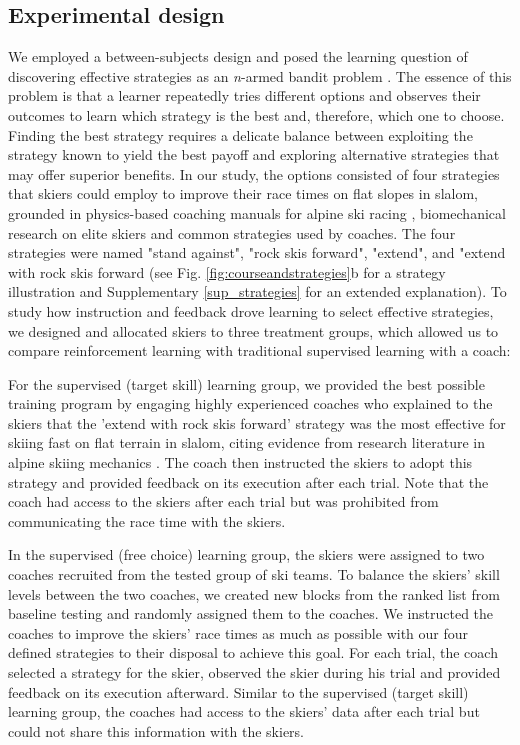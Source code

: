 \documentclass[pdflatex,sn-nature]{sn-jnl}%
\theoremstyle{thmstyleone}%
\theoremstyle{thmstyletwo}%
\theoremstyle{thmstylethree}%
\begin{document}
\subsection{Experimental design}
We employed a between-subjects design and posed the learning question of discovering effective strategies as an \textit{n}-armed bandit problem \cite{sutton_reinforcement_2018}. The essence of this problem is that a learner repeatedly tries different options and observes their outcomes to learn which strategy is the best and, therefore, which one to choose. Finding the best strategy requires a delicate balance between exploiting the strategy known to yield the best payoff and exploring alternative strategies that may offer superior benefits. In our study, the options consisted of four strategies that skiers could employ to improve their race times on flat slopes in slalom, grounded in physics-based coaching manuals for alpine ski racing \cite{lemaster_skiers_1999, lemaster_ultimate_2010, lind_physics_2013, mote_accelerations_1983}, biomechanical research on elite skiers \cite{reid_kinematic_2010, reid_alpine_2020, magelssen_is_2022}  and common strategies used by coaches.  The four strategies were named "stand against", "rock skis forward", "extend", and "extend with rock skis forward (see Fig. \ref{fig:courseandstrategies}b for a strategy illustration and Supplementary \ref{sup_strategies} for an extended explanation). To study how instruction and feedback drove learning to select effective strategies, we designed and allocated skiers to three treatment groups, which allowed us to compare reinforcement learning with traditional supervised learning with a coach: 

For the supervised (target skill) learning group, we provided the best possible training program by engaging highly experienced coaches who explained to the skiers that the 'extend with rock skis forward' strategy was the most effective for skiing fast on flat terrain in slalom, citing evidence from research literature in alpine skiing mechanics \cite{reid_kinematic_2010, mote_accelerations_1983, lind_physics_2013}. The coach then instructed the skiers to adopt this strategy and provided feedback on its execution after each trial. Note that the coach had access to the skiers after each trial but was prohibited from communicating the race time with the skiers.

In the supervised (free choice) learning group, the skiers were assigned to two coaches recruited from the tested group of ski teams. To balance the skiers' skill levels between the two coaches, we created new blocks from the ranked list from baseline testing and randomly assigned them to the coaches. We instructed the coaches to improve the skiers' race times as much as possible with our four defined strategies to their disposal to achieve this goal. For each trial, the coach selected a strategy for the skier, observed the skier during his trial and provided feedback on its execution afterward. Similar to the supervised (target skill) learning group, the coaches had access to the skiers' data after each trial but could not share this information with the skiers.
\end{document}
